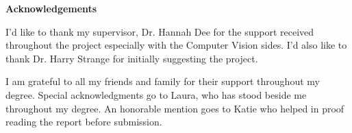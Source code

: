 \thispagestyle{empty}

\begin{center}
    {\LARGE\bf Acknowledgements}
\end{center}

I'd like to thank my supervisor, Dr. Hannah Dee for the support received throughout the project especially with the Computer Vision sides. I'd also like to thank Dr. Harry Strange for initially suggesting the project.

I am grateful to all my friends and family for their support throughout my degree. Special acknowledgments go to Laura, who has stood beside me throughout my degree. An honorable mention goes to Katie who helped in proof reading the report before submission.
